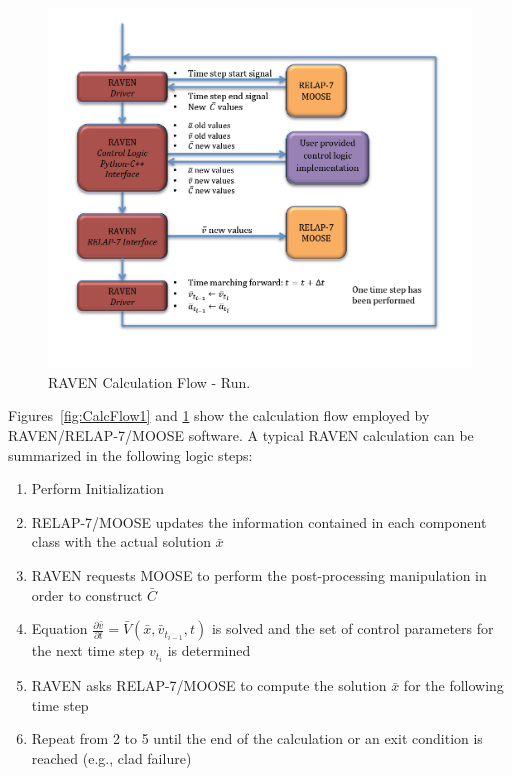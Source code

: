 \documentclass{mc2013}
\begin{document}
\begin{figure} 
  \centering
     \includegraphics[width=1\textwidth]{figures/CalculationFlow_part_2.PNG}
  \caption{RAVEN Calculation Flow - Run.}
  \label{fig:CalcFlow2}
\end{figure}
Figures~\ref{fig:CalcFlow1} and \ref{fig:CalcFlow2} show the calculation flow employed by RAVEN/RELAP-7/MOOSE software. 
A typical RAVEN calculation can be summarized in the following logic steps:
\begin{enumerate}
   \item Perform Initialization
   \item RELAP-7/MOOSE updates the information contained in each component class with the actual solution $\bar{x}$
   \item RAVEN requests MOOSE to perform the post-processing manipulation in order to construct $\bar{C}$ 
   \item Equation 
$\frac{\partial \bar{v}}{\partial t} = \bar{V}(\bar{x},\bar{v}_{t_{i-1}},t) $
is solved and the set of control parameters for the next time step $v_{t_{i}}$ is determined
  \item RAVEN asks RELAP-7/MOOSE to compute the solution $\bar{x}$ for the following time step
  \item Repeat from 2 to 5 until the end of the calculation or an exit condition is reached (e.g., clad failure)
\end{enumerate}
\end{document}
